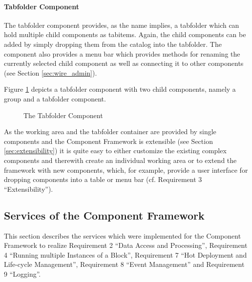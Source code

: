 \paragraph{Tabfolder Component}
The tabfolder component provides, as the name implies, a tabfolder which can hold multiple child
components as tabitems. Again, the child components can be added by simply dropping them from the
catalog into the tabfolder. The component also provides a menu bar which provides methods for
renaming the currently selected child component as well as connecting it to other components (see
Section \ref{sec:wire_admin}).

Figure \ref{fig:tabfolder_component} depicts a tabfolder component with two child components,
namely a group and a tabfolder component.

\begin{figure}
	\centering
	\caption{The Tabfolder Component}
	\label{fig:tabfolder_component}
\end{figure}

As the working area and the tabfolder container are provided by single components and the Component
Framework is extensible (see Section \ref{sec:extensibility}) it is quite easy to either customize
the existing complex components and therewith create an individual working area or to extend the
framework with new components, which, for example, provide a user interface for dropping components
into a table or menu bar (cf. Requirement 3 ``Extensibility'').

\subsection{Services of the Component Framework}

This section describes the services which were implemented for the Component Framework to realize
Requirement 2 ``Data Access and Processing'', Requirement 4 ``Running multiple Instances of a
Block'', Requirement 7 ``Hot Deployment and Life-cycle Management'', Requirement 8 ``Event
Management'' and Requirement 9 ``Logging''.

